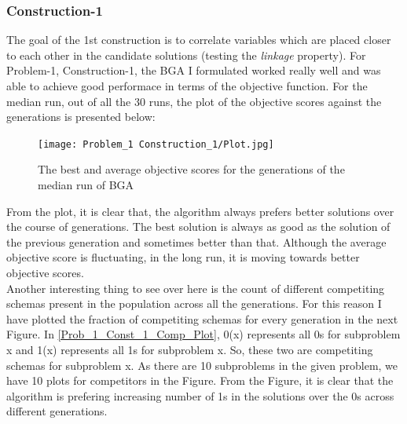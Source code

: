 \documentclass{article}
\begin{document}
	\subsubsection{Construction-1}
	The goal of the 1st construction is to correlate variables which are placed closer to each other in the candidate solutions (testing the \textit{linkage} property). For Problem-1, Construction-1, the BGA I formulated worked really well and was able to achieve good performace in terms of the objective function. For the median run, out of all the 30 runs, the plot of the objective scores against the generations is presented below:
	
	\begin{figure}[H]
		\centering
		\texttt{[image: Problem\_1 Construction\_1/Plot.jpg]}
		\caption{The best and average objective scores for the generations of the median run of BGA}
		\label{Prob_1_Const_1_Plot}
	\end{figure}    
	
	From the plot, it is clear that, the algorithm always prefers better solutions over the course of generations. The best solution is always as good as the solution of the previous generation and sometimes better than that. Although the average objective score is fluctuating, in the long run, it is moving towards better objective scores.\\
	
	Another interesting thing to see over here is the count of different competiting schemas present in the population across all the generations. For this reason I have plotted the fraction of competiting schemas for every generation in the next Figure. In \autoref{Prob_1_Const_1_Comp_Plot}, 0(x) represents all 0s for subproblem x and 1(x) represents all 1s for subproblem x. So, these two are competiting schemas for subproblem x. As there are 10 subproblems in the given problem, we have 10 plots for competitors in the Figure. From the Figure, it is clear that the algorithm is prefering increasing number of 1s in the solutions over the 0s across different generations.\\
	
\end{document}
